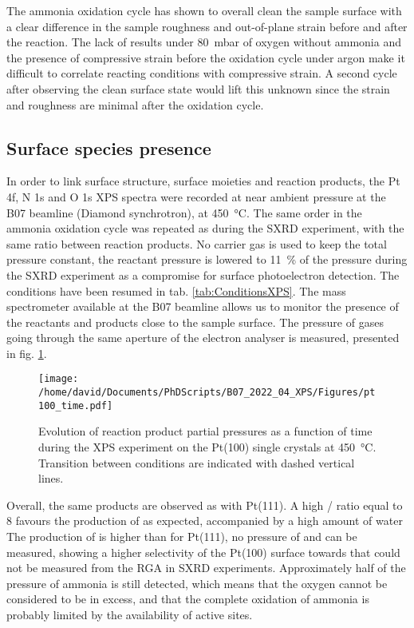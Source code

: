 The ammonia oxidation cycle has shown to overall clean the sample surface with a clear difference in the sample roughness and out-of-plane strain before and after the reaction.
The lack of results under \qty{80}{\milli\bar} of oxygen without ammonia and the presence of compressive strain before the oxidation cycle under argon make it difficult to correlate reacting conditions with compressive strain.
A second cycle after observing the clean surface state would lift this unknown since the strain and roughness are minimal after the oxidation cycle.

\subsection{Surface species presence}

In order to link surface structure, surface moieties and reaction products, the Pt 4f, N 1s and O 1s XPS spectra were recorded at near ambient pressure at the B07 beamline (Diamond synchrotron), at \qty{450}{\degreeCelsius}.
The same order in the ammonia oxidation cycle was repeated as during the SXRD experiment, with the same ratio between reaction products.
No carrier gas is used to keep the total pressure constant, the reactant pressure is lowered to \qty{11}{\percent} of the pressure during the SXRD experiment as a compromise for surface photoelectron detection.
The conditions have been resumed in tab. \ref{tab:ConditionsXPS}.
The mass spectrometer available at the B07 beamline allows us to monitor the presence of the reactants and products close to the sample surface.
The pressure of gases going through the same aperture of the electron analyser is measured, presented in fig. \ref{fig:XPS100RGA}.

\begin{figure}[!htb]
    \centering
    \texttt{[image: /home/david/Documents/PhDScripts/B07\_2022\_04\_XPS/Figures/pt100\_time.pdf]}
    \caption{
        Evolution of reaction product partial pressures as a function of time during the XPS experiment on the Pt(100) single crystals at \qty{450}{\degreeCelsius}.
        Transition between conditions are indicated with dashed vertical lines.
    }
    \label{fig:XPS100RGA}
\end{figure}

Overall, the same products are observed as with Pt(111).
A high / ratio equal to \num{8} favours the production of  as expected, accompanied by a high amount of water
The production of  is higher than for Pt(111), no pressure of  and  can be measured, showing a higher selectivity of the Pt(100) surface towards  that could not be measured from the RGA in SXRD experiments.
Approximately half of the pressure of ammonia is still detected, which means that the oxygen cannot be considered to be in excess, and that the complete oxidation of ammonia is probably limited by the availability of active sites.

